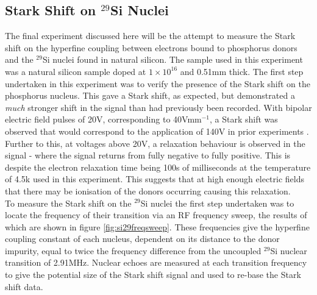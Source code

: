 \subsection{Stark Shift on $^{29}$Si Nuclei}

The final experiment discussed here will be the attempt to measure the Stark shift on the hyperfine coupling between electrons bound to phosphorus donors and the $^{29}$Si nuclei found in natural silicon.
The sample used in this experiment was a natural silicon sample doped at $1\times10^{16}$ and 0.51mm thick.
The first step undertaken in this experiment was to verify the presence of the Stark shift on the phosphorus nucleus.
This gave a Stark shift, as expected, but demonstrated a \emph{much} stronger shift in the signal than had previously been recorded. 
With bipolar electric field pulses of 20V, corresponding to 40Vmm$^{-1}$, a Stark shift was observed that would correspond to the application of 140V in prior experiments \cite{Pica2014,Wolfowicz2015a}.
Further to this, at voltages above 20V, a relaxation behaviour is observed in the signal - where the signal returns from fully negative to fully positive.
This is despite the electron relaxation time being 100s of milliseconds at the temperature of 4.5k used in this experiment.
This suggests that at high enough electric fields that there may be ionisation of the donors occurring causing this relaxation.
\\
To measure the Stark shift on the $^{29}$Si nuclei the first step undertaken was to locate the frequency of their transition via an RF frequency sweep, the results of which are shown in figure \ref{fig:si29freqsweep}. These frequencies give the hyperfine coupling constant of each nucleus, dependent on its distance to the donor impurity, equal to twice the frequency difference from the uncoupled $^{29}$Si nuclear transition of 2.91MHz. Nuclear echoes are measured at each transition frequency to give the potential size of the Stark shift signal and used to re-base the Stark shift data.

